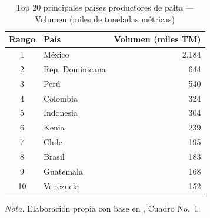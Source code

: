 \begin{table}[H]
\centering
\caption{Top 20 principales pa\'ises productores de palta --- Volumen (miles de toneladas m\'etricas)}
\label{tab:top_productores}
\small
\begin{tabular}{clr}
\toprule
\textbf{Rango} & \textbf{Pa\'is} & \textbf{Volumen (miles TM)} \\
\midrule
1  & M\'exico       & 2.184 \\
2  & Rep. Dominicana & 644 \\
3  & Per\'u         & 540 \\
4  & Colombia       & 324 \\
5  & Indonesia      & 304 \\
6  & Kenia          & 239 \\
7  & Chile          & 195 \\
8  & Brasil         & 183 \\
9  & Guatemala      & 168 \\
10 & Venezuela      & 152 \\
\bottomrule
\end{tabular}
\parbox{0.94\textwidth}{\small \textit{Nota.} Elaboraci\'on propia con base en \citep{SierraSelva2020}, Cuadro No.~1.}
\end{table}
